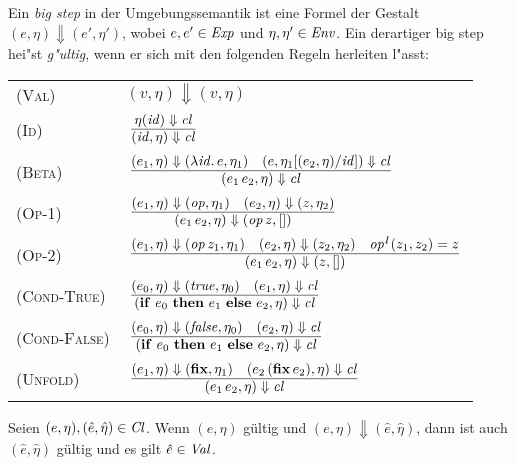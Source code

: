 \documentclass[12pt,fleqn]{article}
\newcommand{\RN}[1]{\mbox{\textsc{(#1)}}}
\newcommand{\Cl}{\name{Cl}}
\newcommand{\cl}{\name{cl}}
\begin{document}
\begin{definition}
Ein {\em big step} in der Umgebungssemantik ist eine Formel der Gestalt $(e,\eta) \Downarrow (e',\eta')$,
wobei $e,e'\in{\text{\it Exp\/}}$ und $\eta,\eta'\in{\text{\it Env\/}}$. Ein derartiger big step hei"st {\em g"ultig}, wenn er sich mit den
folgenden Regeln herleiten l"asst: \\[5mm]
\begin{tabular}{ll}
  \RN{Val}        & $(v,\eta) \Downarrow (v,\eta)$ \\[3mm]
  \RN{Id}         & $\regel{\eta(\id) \Downarrow \cl}
                           {(\id,\eta) \Downarrow \cl}$ \\[3mm]
  \RN{Beta}       & $\regel{(e_1,\eta) \Downarrow (\abstr{\id}{e},\eta_1)
                            \quad (e,\eta_1[(e_2,\eta)/\id]) \Downarrow \cl}
                           {(\app{e_1}{e_2},\eta) \Downarrow \cl}$ \\[3mm]
  \RN{Op-1}       & $\regel{(e_1,\eta) \Downarrow (\op,\eta_1) \quad (e_2,\eta) \Downarrow (z,\eta_2)}
                           {(\app{e_1}{e_2},\eta) \Downarrow (\app{\op}{z},[])}$ \\[3mm]
  \RN{Op-2}       & $\regel{(e_1,\eta) \Downarrow (\app{\op}{z_1},\eta_1)
                            \quad (e_2,\eta) \Downarrow (z_2,\eta_2)
                            \quad \op^I(z_1,z_2) = z}
                           {(\app{e_1}{e_2},\eta) \Downarrow (z,[])}$ \\[3mm]
  \RN{Cond-True}  & $\regel{(e_0,\eta) \Downarrow (\true,\eta_0) \quad (e_1,\eta) \Downarrow \cl}
                           {(\bifte{e_0}{e_1}{e_2},\eta) \Downarrow \cl}$ \\[3mm]
  \RN{Cond-False} & $\regel{(e_0,\eta) \Downarrow (\false,\eta_0) \quad (e_2,\eta) \Downarrow \cl}
                           {(\bifte{e_0}{e_1}{e_2},\eta) \Downarrow \cl}$ \\[3mm]
  \RN{Unfold}     & $\regel{(e_1,\eta) \Downarrow (\bfix,\eta_1)
                            \quad (\app{e_2}{(\app{\bfix}{e_2})},\eta) \Downarrow \cl}
                           {(\app{e_1}{e_2},\eta) \Downarrow \cl}$
\end{tabular}
\end{definition}

\begin{lemma} \label{lemma:Wohldefiniertheit}
  Seien $(e,\eta),(\hat{e},\hat{\eta})\in\Cl$. Wenn $(e,\eta)$ g\"ultig und
  $(e,\eta) \Downarrow (\hat{e},\hat{\eta})$, dann ist auch $(\hat{e},\hat{\eta})$
  g\"ultig und es gilt $\hat{e}\in {\text{\it Val\/}}$.
\end{lemma}
\end{document}

